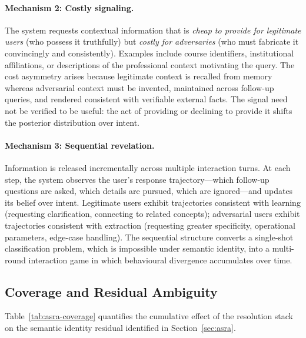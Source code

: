 \paragraph{Mechanism 2: Costly signaling.}
The system requests contextual information that is \emph{cheap to provide for
legitimate users} (who possess it truthfully) but \emph{costly for adversaries}
(who must fabricate it convincingly and consistently).  Examples include course
identifiers, institutional affiliations, or descriptions of the professional
context motivating the query.  The cost asymmetry arises because legitimate
context is recalled from memory whereas adversarial context must be invented,
maintained across follow-up queries, and rendered consistent with verifiable
external facts.  The signal need not be verified to be useful: the act of
providing or declining to provide it shifts the posterior distribution over
intent.

\paragraph{Mechanism 3: Sequential revelation.}
Information is released incrementally across multiple interaction turns.  At
each step, the system observes the user's response trajectory---which follow-up
questions are asked, which details are pursued, which are ignored---and updates
its belief over intent.  Legitimate users exhibit trajectories consistent with
learning (requesting clarification, connecting to related concepts); adversarial
users exhibit trajectories consistent with extraction (requesting greater
specificity, operational parameters, edge-case handling).  The sequential
structure converts a single-shot classification problem, which is impossible
under semantic identity, into a multi-round interaction game in which
behavioural divergence accumulates over time.


\subsection{Coverage and Residual Ambiguity}
\label{sec:asra:coverage}

Table~\ref{tab:asra-coverage} quantifies the cumulative effect of the \asra{}
resolution stack on the semantic identity residual identified in
Section~\ref{sec:asra}.

